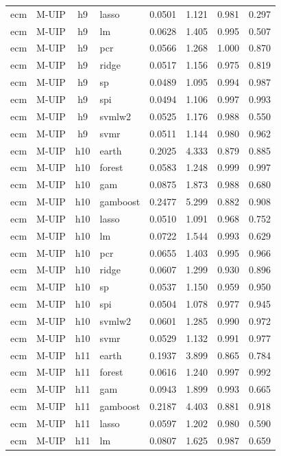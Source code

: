 \begin{ThreePartTable}
\begin{longtable}[t]{llclcccc}
ecm & M-UIP & h9 & lasso & 0.0501 & 1.121 & 0.981 & 0.297\\
ecm & M-UIP & h9 & lm & 0.0628 & 1.405 & 0.995 & 0.507\\
ecm & M-UIP & h9 & pcr & 0.0566 & 1.268 & 1.000 & 0.870\\
ecm & M-UIP & h9 & ridge & 0.0517 & 1.156 & 0.975 & 0.819\\
ecm & M-UIP & h9 & sp & 0.0489 & 1.095 & 0.994 & 0.987\\
ecm & M-UIP & h9 & spi & 0.0494 & 1.106 & 0.997 & 0.993\\
ecm & M-UIP & h9 & svmlw2 & 0.0525 & 1.176 & 0.988 & 0.550\\
ecm & M-UIP & h9 & svmr & 0.0511 & 1.144 & 0.980 & 0.962\\
\addlinespace
ecm & M-UIP & h10 & earth & 0.2025 & 4.333 & 0.879 & 0.885\\
ecm & M-UIP & h10 & forest & 0.0583 & 1.248 & 0.999 & 0.997\\
ecm & M-UIP & h10 & gam & 0.0875 & 1.873 & 0.988 & 0.680\\
ecm & M-UIP & h10 & gamboost & 0.2477 & 5.299 & 0.882 & 0.908\\
ecm & M-UIP & h10 & lasso & 0.0510 & 1.091 & 0.968 & 0.752\\
ecm & M-UIP & h10 & lm & 0.0722 & 1.544 & 0.993 & 0.629\\
ecm & M-UIP & h10 & pcr & 0.0655 & 1.403 & 0.995 & 0.966\\
ecm & M-UIP & h10 & ridge & 0.0607 & 1.299 & 0.930 & 0.896\\
ecm & M-UIP & h10 & sp & 0.0537 & 1.150 & 0.959 & 0.950\\
ecm & M-UIP & h10 & spi & 0.0504 & 1.078 & 0.977 & 0.945\\
ecm & M-UIP & h10 & svmlw2 & 0.0601 & 1.285 & 0.990 & 0.972\\
ecm & M-UIP & h10 & svmr & 0.0529 & 1.132 & 0.991 & 0.977\\
\addlinespace
ecm & M-UIP & h11 & earth & 0.1937 & 3.899 & 0.865 & 0.784\\
ecm & M-UIP & h11 & forest & 0.0616 & 1.240 & 0.997 & 0.992\\
ecm & M-UIP & h11 & gam & 0.0943 & 1.899 & 0.993 & 0.665\\
ecm & M-UIP & h11 & gamboost & 0.2187 & 4.403 & 0.881 & 0.918\\
ecm & M-UIP & h11 & lasso & 0.0597 & 1.202 & 0.980 & 0.590\\
ecm & M-UIP & h11 & lm & 0.0807 & 1.625 & 0.987 & 0.659\\

\end{longtable}
\end{ThreePartTable}
